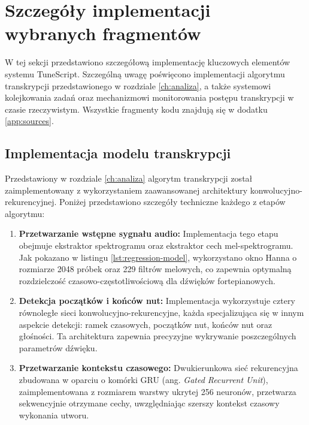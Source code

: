 \documentclass[a4paper,twoside,12pt]{book}
\begin{document}
  \section{Szczegóły implementacji wybranych fragmentów}
  W tej sekcji przedstawiono szczegółową implementację kluczowych elementów systemu TuneScript. Szczególną uwagę poświęcono implementacji algorytmu transkrypcji przedstawionego w rozdziale \ref{ch:analiza}, a także systemowi kolejkowania zadań oraz mechanizmowi monitorowania postępu transkrypcji w czasie rzeczywistym. Wszystkie fragmenty kodu znajdują się w dodatku \ref{app:sources}.
  
  \subsection{Implementacja modelu transkrypcji}
  
  Przedstawiony w rozdziale \ref{ch:analiza} algorytm transkrypcji został zaimplementowany z wykorzystaniem zaawansowanej architektury konwolucyjno-rekurencyjnej. Poniżej przedstawiono szczegóły techniczne każdego z etapów algorytmu:
  
  \begin{enumerate}
      \item \textbf{Przetwarzanie wstępne sygnału audio:} 
      Implementacja tego etapu obejmuje ekstraktor spektrogramu oraz ekstraktor cech mel-spektrogramu. Jak pokazano w listingu \ref{lst:regression-model}, wykorzystano okno Hanna o rozmiarze 2048 próbek oraz 229 filtrów melowych, co zapewnia optymalną rozdzielczość czasowo-częstotliwościową dla dźwięków fortepianowych.
  
      \item \textbf{Detekcja początków i końców nut:}
      Implementacja wykorzystuje cztery równoległe sieci konwolucyjno-rekurencyjne, każda specjalizująca się w innym aspekcie detekcji: ramek czasowych, początków nut, końców nut oraz głośności. Ta architektura zapewnia precyzyjne wykrywanie poszczególnych parametrów dźwięku.
  
      \item \textbf{Przetwarzanie kontekstu czasowego:}
      Dwukierunkowa sieć rekurencyjna zbudowana w oparciu o komórki GRU (ang. \textit{Gated Recurrent Unit}), zaimplementowana z rozmiarem warstwy ukrytej 256 neuronów, przetwarza sekwencyjnie otrzymane cechy, uwzględniając szerszy kontekst czasowy wykonania utworu.
  \end{enumerate}
\end{document}
